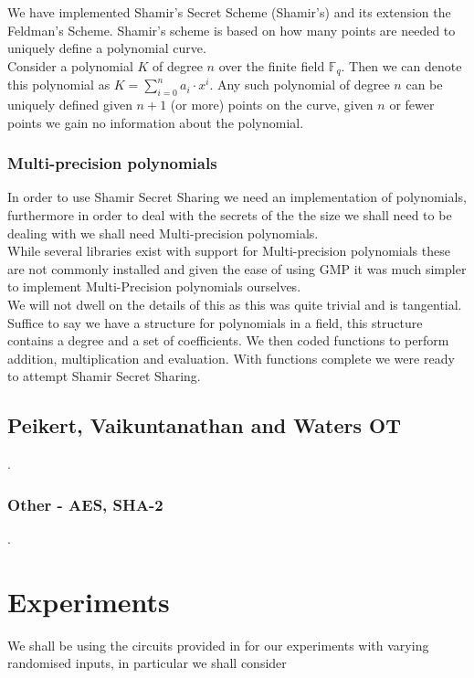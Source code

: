 \documentclass[ %
                    author={Nicholas Tutte},
                supervisor={Prof. Nigel Smart},
                    degree={MEng},
                     title={Secure Two Party Computation},
                  subtitle={A practical comparison of recent protocols},
                      type={Research - GG1K},
                      year={2015} ]{dissertation}
\begin{document}
			We have implemented Shamir's Secret Scheme (Shamir's) and its extension the Feldman's Scheme. Shamir's scheme is based on how many points are needed to uniquely define a polynomial curve.\\

			Consider a polynomial $K$ of degree $n$ over the finite field $\mathbb{F}_q$. Then we can denote this polynomial as $K = \sum_{i=0}^{n} a_i \cdot x ^ i$. Any such polynomial of degree $n$ can be uniquely defined given $n+1$ (or more) points on the curve, given $n$ or fewer points we gain no information about the polynomial.

			\subsection{Multi-precision polynomials}
				In order to use Shamir Secret Sharing we need an implementation of polynomials, furthermore in order to deal with the secrets of the the size we shall need to be dealing with we shall need Multi-precision polynomials.\\
				
				While several libraries exist with support for Multi-precision polynomials these are not commonly installed and given the ease of using GMP it was much simpler to implement Multi-Precision polynomials ourselves.\\

				We will not dwell on the details of this as this was quite trivial and is tangential. Suffice to say we have a structure for polynomials in a field, this structure contains a degree and a set of coefficients. We then coded functions to perform addition, multiplication and evaluation. With functions complete we were ready to attempt Shamir Secret Sharing.
			

		\section{Peikert, Vaikuntanathan and Waters OT}

			.

		\subsection{Other - AES, SHA-2}

			.


	\chapter{Experiments} \label{sec:Results}
		We shall be using the circuits provided in \cite{NigelCircuits} for our experiments with varying randomised inputs, in particular we shall consider
		
\end{document}
